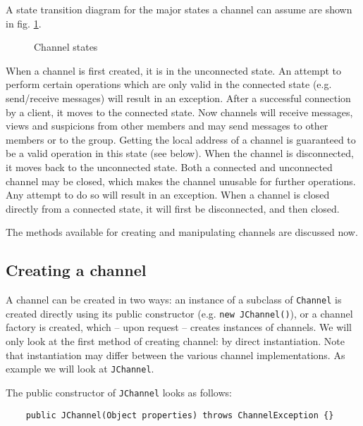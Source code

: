   A state transition diagram for the major states a channel can assume are shown in
  fig. \ref{ChannelStatesFig}.

  \begin{figure}[htb]
      \caption{Channel states}
      \label{ChannelStatesFig}
  \end{figure}

  When a channel is first created, it is in the unconnected state. An attempt to
  perform certain operations which are only valid in the connected state
  (e.g. send/receive messages) will result in an exception. After a successful
  connection by a client, it moves to the connected state. Now channels will
  receive messages, views and suspicions from other members and may send messages
  to other members or to the group. Getting the local address of a channel is
  guaranteed to be a valid operation in this state (see below). When the channel is
  disconnected, it moves back to the unconnected state. Both a connected and
  unconnected channel may be closed, which makes the channel unusable for further
  operations. Any attempt to do so will result in an exception. When a channel is
  closed directly from a connected state, it will first be disconnected, and then
  closed.

  The methods available for creating and manipulating channels are discussed now.


    \subsection{Creating a channel}

    A channel can be created in two ways: an instance of a subclass of {\tt Channel}
    is created directly using its public constructor (e.g. {\tt new JChannel()}),
    or a channel factory is created, which -- upon request -- creates instances of
    channels. We will only look at the first method of creating channel: by direct
    instantiation. Note that instantiation may differ between the various channel
    implementations. As example we will look at {\tt JChannel}.

    The public constructor of {\tt JChannel} looks as follows:

    \begin{small}
    \begin{verbatim}
    public JChannel(Object properties) throws ChannelException {}
    \end{verbatim}
    \end{small}

